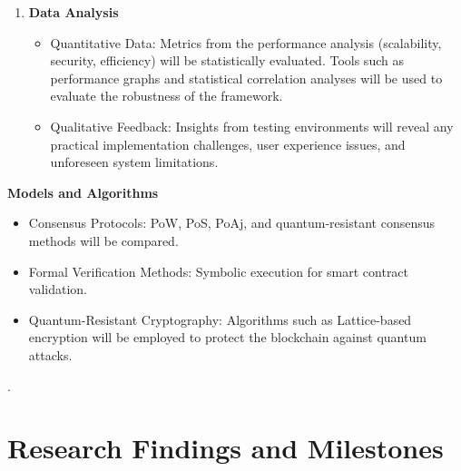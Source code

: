 \documentclass[a4paper, 12pt]{article}
\begin{document}
\begin{enumerate}
\item \textbf{Data Analysis}
\begin{itemize}
    \item Quantitative Data: Metrics from the performance analysis (scalability, security, efficiency) will be statistically evaluated. Tools such as performance graphs and statistical correlation analyses will be used to evaluate the robustness of the framework.
    \item Qualitative Feedback: Insights from testing environments will reveal any practical implementation challenges, user experience issues, and unforeseen system limitations.
\end{itemize}

\end{enumerate}

\textbf{Models and Algorithms}
\begin{itemize}
    \item Consensus Protocols: PoW, PoS, PoAj, and quantum-resistant consensus methods will be compared.
    \item Formal Verification Methods: Symbolic execution for smart contract validation.
    \item Quantum-Resistant Cryptography: Algorithms such as Lattice-based encryption will be employed to protect the blockchain against quantum attacks.
\end{itemize}
\cite{MARIJAN}.

\newpage

\section{Research Findings and Milestones}
\end{document}

